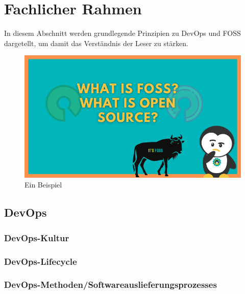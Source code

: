 \documentclass[12pt,titlepage]{article}
\begin{document}


\section{Fachlicher Rahmen}

In diesem Abschnitt werden grundlegende Prinzipien zu DevOps und FOSS dargetellt, um damit das Verständnis der Leser zu stärken.\\

\begin{figure}[h]
    \centering
    \includegraphics[scale=0.7]{Bilder/what-is-foss}
    \caption{Ein Beispiel}
\end{figure}

\subsection{DevOps}



\subsubsection{DevOps-Kultur}



\subsubsection{DevOps-Lifecycle}



\subsubsection{DevOps-Methoden/Softwareauslieferungsprozesses}
\end{document}
